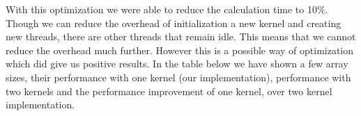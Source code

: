 \documentclass[10pt]{article}
\begin{document}
\begin{multicols}{2}
    With this optimization we were able to reduce the calculation time to 10\%.
    Though we can reduce the overhead of initialization a new kernel and creating new threads, there are other threads that remain idle.
    This means that we cannot reduce the overhead much further.
    However this is a possible way of optimization which did give us positive results.
    In the table below we have shown a few array sizes, their performance with one kernel (our implementation), performance with two kernels \cite{michael} and the performance improvement of one kernel, over two kernel implementation.



\end{multicols}
\end{document}

